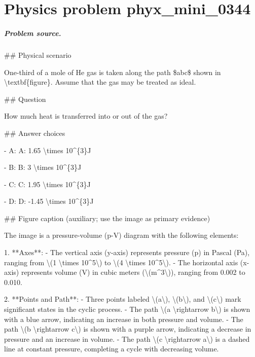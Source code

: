 
\chapter{Physics problem phyx\_mini\_0344}
\label{ch:PhyXMiniProblems_problem_phyx_mini_0344}

\paragraph{Problem source.}
\#\# Physical scenario

One-third of a mole of He gas is taken along the path \$abc\$ shown in \textbackslash{}textbf\{figure\}. Assume that the gas may be treated as ideal.

\#\# Question

How much heat is transferred into or out of the gas?

\#\# Answer choices

- A: A: 1.65 \textbackslash{}times 10\textasciicircum{}\{3\}J

- B: B: 3 \textbackslash{}times 10\textasciicircum{}\{3\}J

- C: C: 1.95 \textbackslash{}times 10\textasciicircum{}\{3\}J

- D: D: -1.45 \textbackslash{}times 10\textasciicircum{}\{3\}J

\#\# Figure caption (auxiliary; use the image as primary evidence)

The image is a pressure-volume (p-V) diagram with the following elements:

1. **Axes**: 
   - The vertical axis (y-axis) represents pressure (p) in Pascal (Pa), ranging from \textbackslash{}(1 \textbackslash{}times 10\textasciicircum{}5\textbackslash{}) to \textbackslash{}(4 \textbackslash{}times 10\textasciicircum{}5\textbackslash{}).
   - The horizontal axis (x-axis) represents volume (V) in cubic meters (\textbackslash{}(m\textasciicircum{}3\textbackslash{})), ranging from 0.002 to 0.010.

2. **Points and Path**:
   - Three points labeled \textbackslash{}(a\textbackslash{}), \textbackslash{}(b\textbackslash{}), and \textbackslash{}(c\textbackslash{}) mark significant states in the cyclic process.
   - The path \textbackslash{}(a \textbackslash{}rightarrow b\textbackslash{}) is shown with a blue arrow, indicating an increase in both pressure and volume.
   - The path \textbackslash{}(b \textbackslash{}rightarrow c\textbackslash{}) is shown with a purple arrow, indicating a decrease in pressure and an increase in volume.
   - The path \textbackslash{}(c \textbackslash{}rightarrow a\textbackslash{}) is a dashed line at constant pressure, completing a cycle with decreasing volume.

